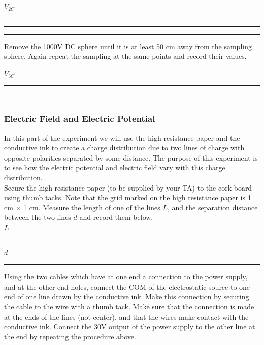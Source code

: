 {{{\vspace{1cm}
  \hspace{2cm}$V_{2C}=$\rule{2.5cm}{.1mm}\hspace{1cm}\rule{2.5cm}{.1mm}\hspace{1cm}\rule{2.5cm}{.1mm}

\vspace{1cm}

\noindent Remove the 1000V DC sphere until it is at least 50 cm
away from the sampling sphere.  Again repeat the sampling at the
same points and record their values.

\vspace{3cm}
  
\hspace{2cm}$V_{3C}=$\rule{2.5cm}{.1mm}\hspace{1cm}\rule{2.5cm}{.1mm}\hspace{1cm}\rule{2.5cm}{.1mm}

\vspace{1cm}

\subsubsection{Electric Field and Electric Potential}
In this part of the experiment we will use the high resistance
paper and the conductive ink to create a charge distribution due
to two lines of charge with opposite polarities separated by
some distance. The purpose of this experiment is to see how the
electric potential and electric field vary with
this charge distribution.\\
Secure the high resistance paper (to be
supplied by your TA) to the cork board using thumb tacks. 
Note that the grid marked on the high resistance paper
is 1 cm $\times$ 1 cm. Measure the length of one of the lines 
$L$, and the separation distance between the two lines $d$ and 
record them below.\\

\vspace{1cm}
\hspace{3cm}$L=$\rule{2cm}{.1mm}\hspace{1cm}$d=$\rule{2cm}{.1mm}
\vspace{1cm}

\noindent Using the two cables which have at one end a connection
to the power supply, and at the other end holes, connect the COM of
the electrostatic source to one end of one line drawn by the
conductive ink.  Make this connection by securing the cable to the
wire with a thumb tack.  Make sure that the connection is made at
the ends of the lines (not center), and that the wires make
contact with the conductive ink. Connect the 30V output of the
power supply to the other line at the end by repeating the procedure above.\\

}}}
